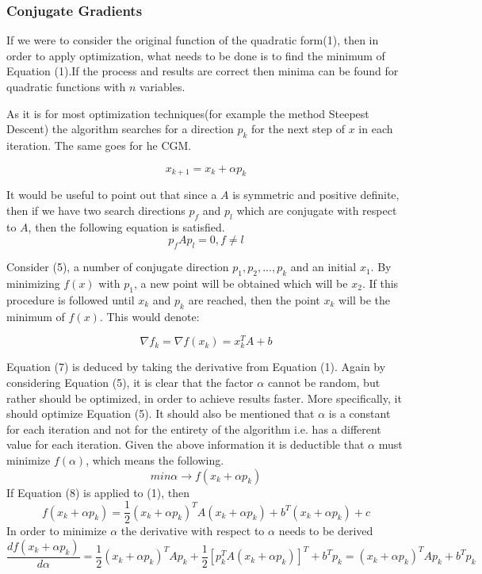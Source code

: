 \documentclass[12pt,twosided]{article}
\begin{document}
\subsubsection{Conjugate Gradients\cite{press2007numerical}\cite{shewchuk1994introduction}\cite{cgm2009lec}}
If we were to consider the original function of the quadratic form(1), then in order to apply optimization, what needs to be done is to find the minimum of Equation (1).If the process and results are correct then minima can be found for quadratic functions with $n$ variables.

As it is for most optimization techniques(for example the method Steepest Descent\cite{rosenbloom1956method}) the algorithm searches for a direction $p_k$ for the next step of $x$ in each iteration. The same goes for he CGM.

\begin{equation}
x_{k+1}=x_k+\alpha p_k
\end{equation}

It would be useful to point out that since a $A$ is symmetric and positive definite, then if we have two search directions $p_f$ and $p_{l}$ which are conjugate with respect to $A$, then the following equation is satisfied.\cite{rast2012managing}
\begin{equation}
p_fAp_l=0, f\neq l
\end{equation}

Consider (5), a number of conjugate direction $p_1,p_2,...,p_{k}$ and an initial $x_1$. By minimizing $f(x)$ with $p_1$, a new point will be obtained which will be $x_2$. If this procedure is followed until $x_k$ and $p_k$ are reached, then the point $x_k$ will be the minimum of $f(x)$. This would denote:

\begin{equation}
\nabla f_k=\nabla f(x_k)=x_k^TA+b
\end{equation}

Equation (7) is deduced by taking the derivative from Equation (1). Again by considering Equation (5), it is clear that the factor $\alpha$ cannot be random, but rather should be optimized, in order to achieve results faster. More specifically, it should optimize Equation (5). It should also be mentioned that $\alpha$ is a constant for each iteration and not for the entirety of the algorithm i.e. has a different value for each iteration. Given the above information it is deductible that $\alpha$ must minimize $f(\alpha)$, which means the following.
\begin{equation}
min \alpha \to f(x_k+\alpha p_k)
\end{equation}
If Equation (8) is applied to (1), then
\begin{equation}
f(x_k+\alpha p_k)=\frac{1}{2}(x_k+\alpha p_k)^TA(x_k+\alpha p_k)+b^T(x_k+\alpha p_k) + c
\end{equation}
In order to minimize $\alpha$ the derivative with respect to $\alpha$ needs to be derived
\begin{equation}
\frac{df(x_k+\alpha p_k)}{d\alpha}=\frac{1}{2}(x_k+\alpha p_k)^TAp_k+\frac{1}{2}[p_k^TA(x_k+\alpha p_k)]^T+b^Tp_k=(x_k+\alpha p_k)^TAp_k+b^Tp_k
\end{equation}
\end{document}
